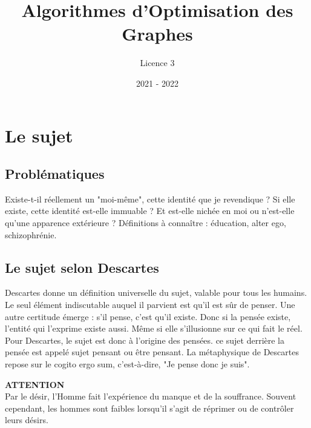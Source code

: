 \documentclass{article}%
\title{Algorithmes d'Optimisation des Graphes}%
\author{Licence 3}%
\date{2021 {-} 2022}%
\begin{document}
%
\normalsize%
\maketitle%
\tableofcontents%
\newpage%
\section{Le sujet}%
\label{sec:Lesujet}%

%
\subsection{Problématiques}%
\label{subsec:Problmatiques}%
Existe{-}t{-}il réellement un "moi{-}même", cette identité que je revendique ?%
\newline%
\newline%
Si elle existe, cette identité est{-}elle immuable ?%
\newline%
\newline%
Et est{-}elle nichée en moi ou n'est{-}elle qu'une apparence extérieure ?%
\newline%
\newline%
Définitions à connaître : éducation, alter ego, schizophrénie.

%
\subsection{Le sujet selon Descartes}%
\label{subsec:LesujetselonDescartes}%
Descartes donne un définition universelle du sujet, valable pour tous les humains. Le seul élément indiscutable auquel il parvient est qu'il est sûr de penser. Une autre certitude émerge : s'il pense, c'est qu'il existe. Donc si la pensée existe, l'entité qui l'exprime existe aussi. Même si elle s'illusionne sur ce qui fait le réel. Pour Descartes, le sujet est donc à l'origine des pensées. ce sujet derrière la pensée est appelé sujet pensant ou être pensant. La métaphysique de Descartes repose sur le cogito ergo sum, c'est{-}à{-}dire, "Je pense donc je suis".

\begin{solution}
{ \scriptsize \textcolor{danger}{ \textbf{ATTENTION}}}
\vspace{3px}
\\ Par le désir, l'Homme fait l'expérience du manque et de la souffrance. Souvent cependant, les hommes sont faibles lorsqu'il s'agit de réprimer ou de contrôler leurs désirs.
\end{solution}

%
\end{document}
